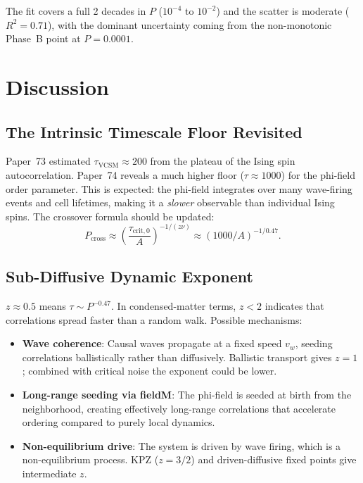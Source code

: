 \documentclass[12pt,a4paper]{article}
\begin{document}
The fit covers a full 2 decades in $P$ ($10^{-4}$ to $10^{-2}$) and the scatter is
moderate ($R^2=0.71$), with the dominant uncertainty coming from the non-monotonic
Phase~B point at $P=0.0001$.

\section{Discussion}

\subsection{The Intrinsic Timescale Floor Revisited}

Paper~73 estimated $\tau_\mathrm{VCSM} \approx 200$ from the plateau of the Ising spin
autocorrelation.  Paper~74 reveals a much higher floor ($\tau \approx 1000$) for the
phi-field order parameter.  This is expected: the phi-field integrates over many
wave-firing events and cell lifetimes, making it a \emph{slower} observable than individual
Ising spins.  The crossover formula should be updated:
\begin{equation}
  P_\mathrm{cross} \approx \left(\frac{\tau_\mathrm{crit,0}}{A}\right)^{-1/(z\nu)}
  \approx (1000 / A)^{-1/0.47}.
\end{equation}

\subsection{Sub-Diffusive Dynamic Exponent}

$z \approx 0.5$ means $\tau \sim P^{-0.47}$.  In condensed-matter terms, $z < 2$
indicates that correlations spread faster than a random walk.  Possible mechanisms:
\begin{itemize}
  \item \textbf{Wave coherence}: Causal waves propagate at a fixed speed $v_w$,
        seeding correlations ballistically rather than diffusively.  Ballistic transport
        gives $z=1$; combined with critical noise the exponent could be lower.
  \item \textbf{Long-range seeding via fieldM}: The phi-field is seeded at birth from
        the neighborhood, creating effectively long-range correlations that accelerate
        ordering compared to purely local dynamics.
  \item \textbf{Non-equilibrium drive}: The system is driven by wave firing, which is
        a non-equilibrium process.  KPZ ($z=3/2$) and driven-diffusive fixed points
        give intermediate $z$.
\end{itemize}
\end{document}
